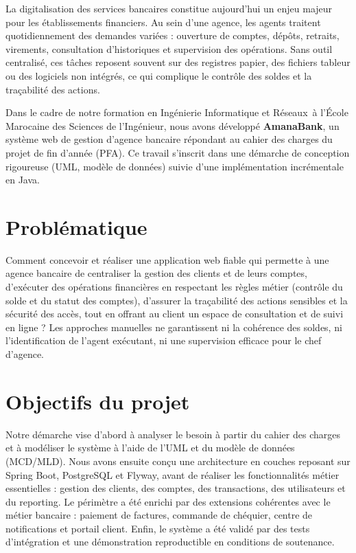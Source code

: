 \documentclass[11pt,a4paper,oneside]{report}
\newcommand{\ecole}{École Marocaine des Sciences de l'Ingénieur}
\newcommand{\filiere}{Ingénierie Informatique et Réseaux}
\newcommand{\nomapplication}{AmanaBank}
\begin{document}
La digitalisation des services bancaires constitue aujourd'hui un enjeu majeur pour les établissements financiers. Au sein d'une agence, les agents traitent quotidiennement des demandes variées : ouverture de comptes, dépôts, retraits, virements, consultation d'historiques et supervision des opérations. Sans outil centralisé, ces tâches reposent souvent sur des registres papier, des fichiers tableur ou des logiciels non intégrés, ce qui complique le contrôle des soldes et la traçabilité des actions.

Dans le cadre de notre formation en \filiere\ à l'\ecole, nous avons développé \textbf{\nomapplication}, un système web de gestion d'agence bancaire répondant au cahier des charges du projet de fin d'année (PFA). Ce travail s'inscrit dans une démarche de conception rigoureuse (UML, modèle de données) suivie d'une implémentation incrémentale en Java.

\section{Problématique}

Comment concevoir et réaliser une application web fiable qui permette à une agence bancaire de centraliser la gestion des clients et de leurs comptes, d'exécuter des opérations financières en respectant les règles métier (contrôle du solde et du statut des comptes), d'assurer la traçabilité des actions sensibles et la sécurité des accès, tout en offrant au client un espace de consultation et de suivi en ligne ? Les approches manuelles ne garantissent ni la cohérence des soldes, ni l'identification de l'agent exécutant, ni une supervision efficace pour le chef d'agence.

\section{Objectifs du projet}

Notre démarche vise d'abord à analyser le besoin à partir du cahier des charges et à modéliser le système à l'aide de l'UML et du modèle de données (MCD/MLD). Nous avons ensuite conçu une architecture en couches reposant sur Spring Boot, PostgreSQL et Flyway, avant de réaliser les fonctionnalités métier essentielles : gestion des clients, des comptes, des transactions, des utilisateurs et du reporting. Le périmètre a été enrichi par des extensions cohérentes avec le métier bancaire : paiement de factures, commande de chéquier, centre de notifications et portail client. Enfin, le système a été validé par des tests d'intégration et une démonstration reproductible en conditions de soutenance.
\end{document}

